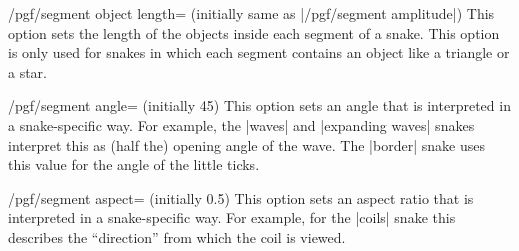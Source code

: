 \begin{key}{/pgf/segment object length= (initially
    \normalfont same as |/pgf/segment amplitude|)}
  This option sets the length of the objects inside each segment of a
  snake. This option is only used for snakes in which each segment
  contains an object like a triangle or a star. 
\begin{codeexample}[]
\end{codeexample}
\end{key}

\begin{key}{/pgf/segment angle= (initially 45)}
  This option sets an angle that is interpreted in a snake-specific
  way. For example, the |waves| and |expanding waves| snakes interpret
  this as (half the) opening angle of the wave. The |border| snake
  uses this value for the angle of the little ticks.
\begin{codeexample}[]
\end{codeexample}
\begin{codeexample}[]
\end{codeexample}
\end{key}

\begin{key}{/pgf/segment aspect= (initially 0.5)}
  This option sets an aspect ratio that is interpreted in a
  snake-specific way. For example, for the |coils| snake this
  describes the ``direction'' from which the coil is viewed.
\begin{codeexample}[]
\end{codeexample}
\end{key}


